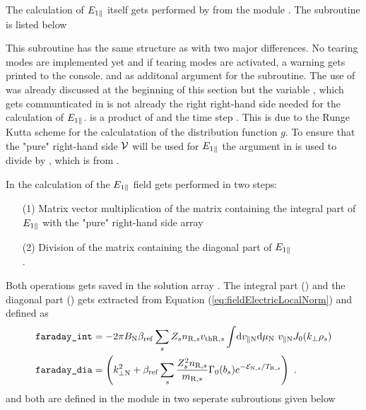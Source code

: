 The calculation of $E_{1\parallel}$ itself gets performed by  from the module . The subroutine is listed below



This subroutine has the same structure as  with two major differences.
No tearing modes are implemented yet and if tearing modes are activated, a warning gets printed to the console.  and  as additonal argument for the subroutine. The use of  was already discussed at the beginning of this section but the variable , which gets communticated in  is not already the right right-hand side needed for the calculation of $E_{1\parallel}$.  is a product of  and the time step . This is due to the Runge Kutta scheme for the calculatation of the distribution function $g$. To ensure that the "pure" right-hand side $\mathcal{V}$ will be used for $E_{1\parallel}$ the argument  in  is used to divide  by , which is  from . \bigskip

In \gkw the calculation of the $E_{1\parallel}$ field gets performed in two steps:
\begin{enumerate}
    \item [(1)] Matrix vector multiplication of the matrix containing the integral part of $E_{1\parallel}$ with the "pure" right-hand side array  \\
    \item [(2)] Division of the matrix containing the diagonal part of $E_{1\parallel}$ \\
                .
\end{enumerate}
Both operations gets saved in the solution array . The integral part () and the diagonal part () gets extracted from Equation (\ref{eq:fieldElectricLocalNorm}) and defined as
\begin{gather}
    \begin{aligned}
        \texttt{faraday\_int} &= - 2\pi B_\mathrm{N} \beta_\mathrm{ref} \sum_s Z_s n_{\mathrm{R},s} v_{\mathrm{th}\mathrm{R},s} \int \! \mathrm{d}v_{\parallel \mathrm{N}} \mathrm{d}\mu_\mathrm{N} ~ v_{\parallel \mathrm{N}} J_0(k_\perp \rho_s)\\
        \texttt{faraday\_dia} &= \left(k_{\perp \mathrm{N}}^2 + \beta_\mathrm{ref} \sum_s \frac{Z^2_sn_{\mathrm{R},s}}{m_{\mathrm{R},s}} \Gamma_0(b_s) e^{-\mathcal{E}_{\mathrm{N},s}/T_{\mathrm{R},s}} \right)~.
    \end{aligned}
\end{gather}
 and  both are defined in the module  in two seperate subroutions given below

